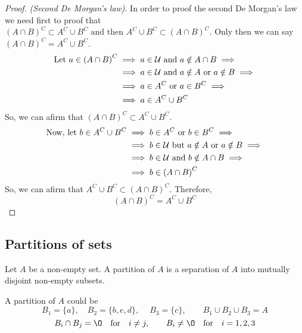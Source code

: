 \begin{proof}
    \textit{(Second De Morgan's law)}. In order to proof the second De Morgan's law we need first to proof that $\left( A\cap B \right)^C\subset A^C\cup B^C \textrm{ and then } A^C\cup B^C \subset \left(  A\cap B\right)^C$. Only then we can say $\left( A\cap B \right)^C = A^C\cup B^C $. 
    \begin{align}
        \textrm{Let } a\in\left( A\cap B \right)^C &\implies a\in\mathcal{U}\textrm{ and } a\notin A\cap B \implies \\
                                     &\implies a\in\mathcal{U}\textrm{ and } a\notin A\textrm{ or } a\notin B \implies \\ &\implies a\in A^C\textrm{ or } a\in B^C \implies \\
                                                         &\implies a\in A^C\cup B^C
    \end{align}
    So, we can afirm that $\left( A\cap B \right)^C \subset A^C\cup B^C $.
    \begin{align}
        \textrm{Now, let } b\in A^C\cup B^C &\implies b\in A^C\textrm{ or } b\in B^C \implies \\
                                            &\implies b\in\mathcal{U}\textrm{ but } a\notin A\textrm{ or } a\notin B \implies \\ &\implies b\in\mathcal{U}\textrm{ and } b\notin A\cap B \implies \\
                                            &\implies b\in \left( A\cap B \right)^C
    \end{align}
    So, we can afirm that $A^C\cup B^C\subset\left( A\cap B \right)^C $. Therefore,
    \begin{equation}
        \left( A\cap B \right)^C = A^C\cup B^C
    \end{equation}

\end{proof}

\subsection{Partitions of sets}
\begin{definition}
    Let $A$ be a non-empty set. A partition of $A$ is a separation of $A$ into mutually disjoint non-empty subsets.
\end{definition}
\begin{example}[Let $A = \{a, b, c, d, e\} $.]
    A partition of $A$ could be
    \begin{equation}
        B_1 = \{a\}, \quad B_2 = \{b, e, d\}, \quad\ B_3 = \{c\}, \quad\quad B_1\cup B_2\cup B_3 = A
    \end{equation}
    \begin{equation}
        B_i\cap B_j = \O\quad\textrm{for}\quad i\neq j,\quad\quad B_i\neq\O\quad\textrm{for}\quad i = 1, 2, 3
    \end{equation}
\end{example}

